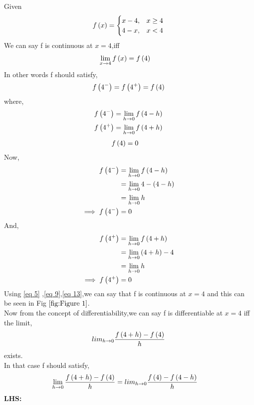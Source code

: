 \documentclass[journal,12pt,twocolumn]{IEEEtran}
\begin{document}
  Given  
            \begin{equation*} 
                 f\left(x\right)  = \begin{cases}
                              x - 4,  & x \geq 4 \\
                              4 - x , & x  <  4
                           \end{cases}
            \end{equation*}  
   We can say f is continuous at $x = 4$,iff 
            \begin{align}
                 \lim_{x \to 4}f\left(x\right) &= f\left(4\right)
            \end{align}
    In other words f should satisfy,
            \begin{align}
                 f\left(4^-\right) =f\left(4^+\right) =f\left(4\right) 
            \end{align}
    where,
            \begin{align}
                 f\left(4^-\right) &=  \lim_{h\to0}f\left(4-h\right)\\
                 f\left(4^+\right) &= \lim_{h\to0}f\left(4+h\right)
            \end{align}
            \begin{align}
                 f\left(4\right) &= 0\label{eq 5}
            \end{align}
    Now,
            \begin{align}
                 f\left(4^-\right)  &= \lim_{h\to0}f\left(4-h\right)\\
                                    &= \lim_{h\to0} 4 - \left(4-h\right)\\
                                    &= \lim_{h\to0} h\\
                 \implies f\left(4^-\right) &= 0\label{eq 9}
            \end{align}
    And,
            \begin{align}
                 f\left(4^+\right) &= \lim_{h\to0}f\left(4+h\right)\\
                                    &= \lim_{h\to0} \left(4+h\right)-4\\
                                    &= \lim_{h\to0} h \\
                 \implies f\left(4^+\right) &= 0\label{eq 13}
            \end{align}
    Using \eqref{eq 5} ,\eqref{eq 9},\eqref{eq 13},we can say that f is continuous at $ x = 4 $ and this can be seen in Fig $\ref{fig:Figure 1}$.\\
    Now from the concept of differentiability,we can say f is differentiable at $ x = 4 $ iff the limit,
             \[
                lim_{h \to 0}\frac{f\left(4 + h\right) - f\left(4\right)}{h}
             \] exists.\\
    In that case f should satisfy,
            \begin{align}
                 \lim_{h \to 0}\frac{f\brak{4 + h} - f\brak{4}}{h}  &=  lim_{h \to 0}\frac{f\brak{4} - f\brak{4-h}}{h}\label{eq 12} %
            \end{align}
 \textbf{LHS:}
\end{document}
